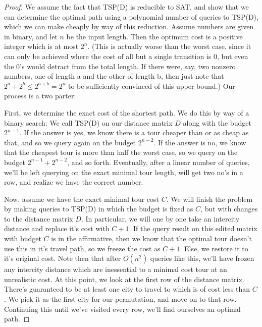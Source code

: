 \begin{proof}
    We assume the fact that TSP(D) is reducible to SAT, and show that we can determine the optimal path using a polynomial number of queries to TSP(D), which we can make cheaply by way of this reduction. Assume numbers are given in binary, and let $n$ be the input length. Then the optimum cost is a positive integer which is at most $2^n$. (This is actually worse than the worst case, since it can only be achieved where the cost of all but a single transition is 0, but even the 0's would detract from the total length. If there were, say, two nonzero numbers, one of length a and the other of length b, then just note that $2^a + 2^b \leq 2^{a+b} = 2^n$ to be sufficiently convinced of this upper bound.) Our process is a two parter:
    \par First, we determine the exact cost of the shortest path. We do this by way of a binary search: We call TSP(D) on our distance matrix $D$ along with the budget $2^{n-1}$. If the answer is yes, we know there is a tour cheaper than or as cheap as that, and so we query again on the budget $2^{n-2}$. If the answer is no, we know that the cheapest tour is more than half the worst case, so we query on the budget $2^{n-1}+2^{n-2}$, and so forth. Eventually, after a linear number of queries, we'll be left querying on the exact minimal tour length, will get two no's in a row, and realize we have the correct number.
    \par Now, assume we have the exact minimal tour cost $C$. We will finish the problem by making queries to TSP(D) in which the budget is fixed as $C$, but with changes to the distance matrix $D$. In particular, we will one by one take an intercity distance and replace it's cost with $C+1$. If the query result on this edited matrix with budget $C$ is in the affirmative, then we know that the optimal tour doesn't use this in it's travel path, so we freeze the cost as $C+1$. Else, we restore it to it's original cost. Note then that after $O(n^2)$ queries like this, we'll have frozen any intercity distance which are inessential to a minimal cost tour at an unrealistic cost. At this point, we look at the first row of the distance matrix. There's guaranteed to be at least one city to travel to which is of cost less than $C$. We pick it as the first city for our permutation, and move on to that row. Continuing this until we've visited every row, we'll find ourselves an optimal path.
\end{proof}
